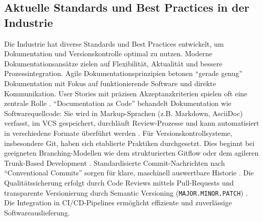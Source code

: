 \documentclass[12pt,oneside]{article}
\begin{document}
    \subsection{Aktuelle Standards und Best Practices in der Industrie}
    \label{subsec:standards}
    Die Industrie hat diverse Standards und Best Practices entwickelt, um Dokumentation und Versionskontrolle optimal zu nutzen.
    \newline
    Moderne Dokumentationsansätze zielen auf Flexibilität, Aktualität und bessere Prozessintegration. Agile Dokumentationsprinzipien betonen ``gerade genug'' Dokumentation mit Fokus auf funktionierende Software und direkte Kommunikation. User Stories mit präzisen Akzeptanzkriterien spielen oft eine zentrale Rolle \cite{AgileManifestoDe, fraunhoferIESE2020agilMytho}.
    ``Documentation as Code'' behandelt Dokumentation wie Softwarequellcode: Sie wird in Markup-Sprachen (z.B. Markdown, AsciiDoc) verfasst, im VCS gespeichert, durchläuft Review-Prozesse und kann automatisiert in verschiedene Formate überführt werden \cite{WriteTheDocsWhatIsDocsAsCode}.
    \newline
    Für Versionskontrollsysteme, insbesondere Git, haben sich etablierte Praktiken durchgesetzt.
    Dies beginnt bei geeigneten Branching-Modellen wie dem strukturierten Gitflow oder dem agileren Trunk-Based Development \cite{AtlassianGitWorkflows}.
    Standardisierte Commit-Nachrichten nach ``Conventional Commits'' sorgen für klare, maschinell auswertbare Historie \cite{ConventionalCommitsOrgDe}.
    Die Qualitätssicherung erfolgt durch Code Reviews mittels Pull-Requests und transparente Versionierung durch Semantic Versioning (\texttt{MAJOR.MINOR.PATCH}) \cite{AtlassianWasIstEinPullRequest, SemVerOrgDe}.
    Die Integration in CI/CD-Pipelines ermöglicht effiziente und zuverlässige Softwareauslieferung.
\end{document}
